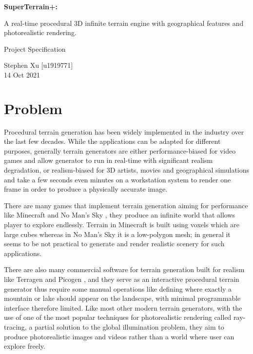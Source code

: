\documentclass[oneside, a4paper]{article}
\begin{document}
    \begin{titlepage}
        \begin{center}
            \huge
            \vspace*{4cm}
            \textbf{SuperTerrain+:}
            
            \vspace*{1cm}
            A real-time procedural 3D infinite terrain engine with geographical features and photorealistic rendering.

            \LARGE
            \vspace*{2cm}
            Project Specification

            \vspace*{1cm}
            Stephen Xu [u1919771] \\
            14 Oct 2021
        \end{center}
    \end{titlepage}
    \newpage
    \large
    \flushleft
    
    \section{Problem}

    Procedural terrain generation has been widely implemented in the industry over the last few decades. While the applications can be adapted for different purposes, generally terrain generators are either performance-biased for video games and allow generator to run in real-time with significant realism degradation, or realism-biased for 3D artists, movies and geographical simulations and take a few seconds even minutes on a workstation system to render one frame in order to produce a physically accurate image.

    There are many games that implement terrain generation aiming for performance like Minecraft \cite{mc} and No Man's Sky \cite{no_mans_sky}, they produce an infinite world that allows player to explore endlessly. Terrain in Minecraft is built using voxels which are large cubes whereas in No Man's Sky it is a low-polygon mesh; in general it seems to be not practical to generate and render realistic scenery for such applications.
    
    There are also many commercial software for terrain generation built for realism like Terragen \cite{terragen} and Picogen \cite{picogen}, and they serve as an interactive procedural terrain generator thus require some manual operations like defining where exactly a mountain or lake should appear on the landscape, with minimal programmable interface therefore limited. Like most other modern terrain generators, with the use of one of the most popular techniques for photorealistic rendering called ray-tracing, a partial solution to the global illumination problem, they aim to produce photorealistic images and videos rather than a world where user can explore freely.
\end{document}

